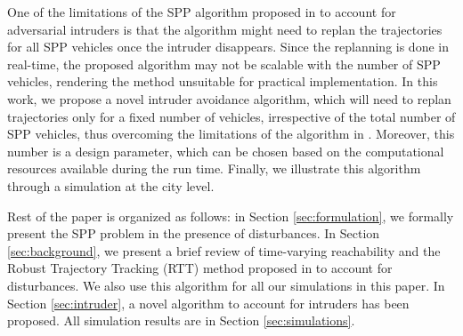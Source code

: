 One of the limitations of the SPP algorithm proposed in \cite{chen2016robust} to account for adversarial intruders is that the algorithm might need to replan the trajectories for all SPP vehicles once the intruder disappears. Since the replanning is done in real-time, the proposed algorithm may not be scalable with the number of SPP vehicles, rendering the method unsuitable for practical implementation. In this work, we propose a novel intruder avoidance algorithm, which will need to replan trajectories only for a fixed number of vehicles, irrespective of the total number of SPP vehicles, thus overcoming the limitations of the algorithm in \cite{chen2016robust}. Moreover, this number is a design parameter, which can be chosen based on the computational resources available during the run time. Finally, we illustrate this algorithm through a simulation at the city level. 

Rest of the paper is organized as follows: in Section \ref{sec:formulation}, we formally present the SPP problem in the presence of disturbances. In Section \ref{sec:background}, we present a brief review of time-varying reachability and the Robust Trajectory Tracking (RTT) method proposed in \cite{Bansal2017} to account for disturbances. We also use this algorithm for all our simulations in this paper. In Section \ref{sec:intruder}, a novel algorithm to account for intruders has been proposed. All simulation results are in Section \ref{sec:simulations}. 